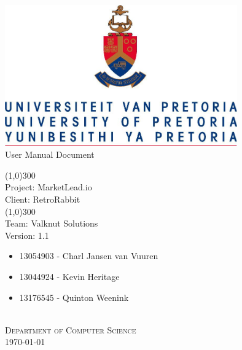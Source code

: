 \documentclass{article}
\begin{document}
	\begin{titlepage}
		\begin{center}
			\includegraphics[width=10cm]{images/UP.jpg}  \\
			[0.5cm]
			\huge{
			User Manual Document\\
			}
			
			\line(1,0){300}\\
			[0.2cm]
			\LARGE{Project: MarketLead.io\\
			Client: RetroRabbit} \\
			\line(1,0){300}\\
			\LARGE{Team: Valknut Solutions}\\
			[1.0cm]
			\large{Version: 1.1}\\
			[1.0cm]
			\large
			{
			\begin{itemize}
				\item 13054903 - Charl Jansen van Vuuren    
				\item 13044924 - Kevin Heritage
				\item 13176545 - Quinton Weenink\\
			\end{itemize}
			}
			\textsc{\large}\\
		[3.0cm]
		\textsc{\large  Department of Computer Science}\\
		[0.5cm]
		\textsc{\large \today}\\
		\end{center}
	\end{titlepage}
	
	\cleardoublepage
	\begin{versionhistory}
	\end{versionhistory}	
	
\end{document}
